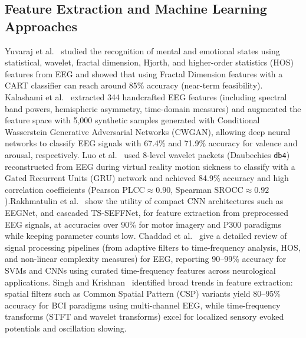 \documentclass[12pt, a4paper]{report}
\begin{document}
\subsection{Feature Extraction and Machine Learning Approaches}
\label{subsec:lit_feature_extraction}
Yuvaraj et al.~\cite{Yuvaraj2023} studied the recognition of mental and emotional states using statistical, wavelet, fractal dimension, Hjorth, and higher-order statistics (HOS) features from EEG and showed that using Fractal Dimension features with a CART classifier can reach around 85\% accuracy (near-term feasibility). Kalashami et al.~\cite{Kalashami2022} extracted 344 handcrafted EEG features (including spectral band powers, hemispheric asymmetry, time-domain measures) and augmented the feature space with 5{,}000 synthetic samples generated with Conditional Wasserstein Generative Adversarial Networks (CWGAN), allowing deep neural networks to classify EEG signals with 67.4\% and 71.9\% accuracy for valence and arousal, respectively. Luo et al.~\cite{Luo2024} used 8-level wavelet packets (Daubechies \texttt{db4}) reconstructed from EEG during virtual reality motion sickness to classify with a Gated Recurrent Units (GRU) network and achieved 84.9\% accuracy and high correlation coefficients (Pearson $\text{PLCC} \approx 0.90$, Spearman $\text{SROCC} \approx 0.92$).Rakhmatulin et al.~\cite{Rakhmatulin2024} show the utility of compact CNN architectures such as EEGNet, and cascaded TS-SEFFNet, for feature extraction from preprocessed EEG signals, at accuracies over 90\% for motor imagery and P300 paradigms while keeping parameter counts low. Chaddad et al.~\cite{Chaddad2023} give a detailed review of signal processing pipelines (from adaptive filters to time-frequency analysis, HOS, and non-linear complexity measures) for EEG, reporting 90--99\% accuracy for SVMs and CNNs using curated time-frequency features across neurological applications. Singh and Krishnan~\cite{Singh2023} identified broad trends in feature extraction: spatial filters such as Common Spatial Pattern (CSP) variants yield 80--95\% accuracy for BCI paradigms using multi-channel EEG, while time-frequency transforms (STFT and wavelet transforms) excel for localized sensory evoked potentials and oscillation slowing.
\end{document}
